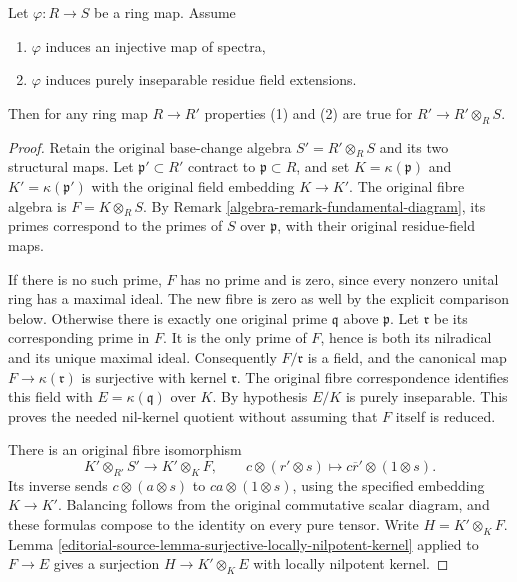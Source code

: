 \begin{lemma}
\label{editorial-source-lemma-radicial}
Let $\varphi : R \to S$ be a ring map. Assume
\begin{enumerate}
\item $\varphi$ induces an injective map of spectra,
\item $\varphi$ induces purely inseparable residue field extensions.
\end{enumerate}
Then for any ring map $R \to R'$ properties (1) and (2) are true for
$R' \to R' \otimes_R S$.
\end{lemma}

\begin{proof}
Retain the original base-change algebra
$S'=R'\otimes_R S$ and its two structural
maps. Let $\mathfrak p'\subset R'$ contract
to $\mathfrak p\subset R$, and set
$K=\kappa(\mathfrak p)$ and
$K'=\kappa(\mathfrak p')$ with the original
field embedding $K\to K'$. The original
fibre algebra is $F=K\otimes_R S$.
By Remark \ref{algebra-remark-fundamental-diagram},
its primes correspond to the primes
of $S$ over $\mathfrak p$, with their
original residue-field maps.

If there is no such prime, $F$ has
no prime and is zero, since every
nonzero unital ring has a maximal
ideal. The new fibre is zero as
well by the explicit comparison
below. Otherwise there is exactly
one original prime $\mathfrak q$
above $\mathfrak p$. Let $\mathfrak r$
be its corresponding prime in $F$.
It is the only prime of $F$, hence
is both its nilradical and its
unique maximal ideal. Consequently
$F/\mathfrak r$ is a field, and
the canonical map $F\to\kappa(\mathfrak r)$
is surjective with kernel $\mathfrak r$.
The original fibre correspondence
identifies this field with
$E=\kappa(\mathfrak q)$ over $K$.
By hypothesis $E/K$ is purely
inseparable. This proves the
needed nil-kernel quotient without
assuming that $F$ itself is reduced.

There is an original fibre isomorphism
$$
K'\otimes_{R'} S'\longrightarrow
K'\otimes_K F,\qquad
c\otimes(r'\otimes s)\longmapsto
c\overline r'\otimes(1\otimes s).
$$
Its inverse sends
$c\otimes(a\otimes s)$ to
$ca\otimes(1\otimes s)$, using the
specified embedding $K\to K'$.
Balancing follows from the original
commutative scalar diagram, and
these formulas compose to the
identity on every pure tensor.
Write $H=K'\otimes_K F$.
Lemma \ref{editorial-source-lemma-surjective-locally-nilpotent-kernel}
applied to $F\to E$ gives a
surjection
$H\to K'\otimes_K E$ with locally
nilpotent kernel.


\end{proof}
